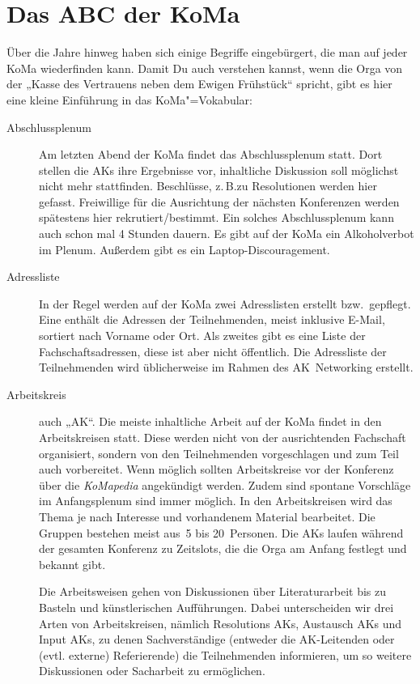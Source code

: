 \chapter{Das ABC der KoMa}

Über die Jahre hinweg haben sich einige Begriffe eingebürgert, die man auf jeder KoMa wiederfinden kann. Damit Du auch verstehen kannst, wenn die Orga von der „Kasse des Vertrauens neben dem Ewigen Frühstück“ spricht, gibt es hier eine kleine Einführung in das KoMa"=Vokabular:

\begin{description}
\item[Abschlussplenum]
    Am letzten Abend der KoMa findet das Abschlussplenum statt. Dort stellen die AKs ihre Ergebnisse vor, inhaltliche Diskussion soll möglichst nicht mehr stattfinden. Beschlüsse, z.\,B.\@ zu Resolutionen werden hier gefasst.  Freiwillige für die Ausrichtung der nächsten Konferenzen werden spätestens hier rekrutiert/bestimmt. Ein solches Abschlussplenum kann auch schon mal 4 Stunden dauern. Es gibt auf der KoMa ein Alkoholverbot im Plenum. Außerdem gibt es ein Laptop-Discouragement.

\item[Adressliste]
    In der Regel werden auf der KoMa zwei Adresslisten erstellt bzw.\ gepflegt. Eine enthält die Adressen der Teilnehmenden, meist inklusive E-Mail, sortiert nach Vorname oder Ort.  Als zweites gibt es eine Liste der Fachschaftsadressen, diese ist aber nicht öffentlich. Die Adressliste der Teilnehmenden wird üblicherweise im Rahmen des AK~Networking erstellt.

\item[Arbeitskreis]
    auch „AK“. Die meiste inhaltliche Arbeit auf der KoMa findet in den Arbeitskreisen statt. Diese werden nicht von der ausrichtenden Fachschaft organisiert, sondern von den Teilnehmenden vorgeschlagen und zum Teil auch vorbereitet. Wenn möglich sollten Arbeitskreise vor der Konferenz über die \emph{KoMapedia} angekündigt werden. Zudem sind spontane Vorschläge im Anfangsplenum sind immer möglich. In den Arbeitskreisen wird das Thema je nach Interesse und vorhandenem Material bearbeitet. Die Gruppen bestehen meist aus~5 bis 20~Personen. Die AKs laufen während der gesamten Konferenz zu Zeitslots, die die Orga am Anfang festlegt und bekannt gibt.
	
	Die Arbeitsweisen gehen	von Diskussionen über Literaturarbeit bis zu Basteln und künstlerischen Aufführungen. Dabei unterscheiden wir drei Arten von Arbeitskreisen, nämlich Resolutions AKs, Austausch AKs und Input AKs, zu denen Sachverständige (entweder die AK-Leitenden oder (evtl. externe) Referierende) die Teilnehmenden informieren, um so weitere Diskussionen oder Sacharbeit zu ermöglichen.


\end{description}
